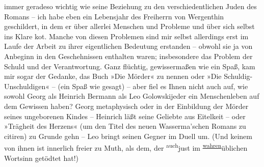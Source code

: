                immer geradeso wichtig wie seine Beziehung zu den verschiedentlichen Juden des Romans – ich habe eben ein
               Lebensjahr des Freiherrn von
                  Wergenthin geschildert, in dem er über allerlei Menschen und Probleme und
               über sich selbst ins Klare ko{\geminationm}t. Manche von diesen
               Problemen sind mir selbst allerdings erst im Laufe der Arbeit zu ihrer eigentlichen
               Bedeutung erstanden – obwohl sie ja von Anbeginn in den Geschehnissen enthalten
               waren; insbesondere das Problem der Schuld und der Verantwortung. Ganz flüchtig,
               gewissermaßen {\pb}wie ein Spaß, kam mir sogar der
               Gedanke, das Buch »Die Mörder« zu nennen oder »Die Schuldig-Unschuldigen« – (ein Spaß
               wie gesagt) – aber fiel es Ihnen nicht auch auf, wie sowohl Georg als Heinrich Bermann als Leo Golowski\introOben{}jeder\introOben{} ein Menschenleben auf dem Gewissen haben? Georg metaphysisch oder in der
               Einbildung der Mörder seines ungeborenen Kindes – Heinrich läßt seine Geliebte aus Eitelkeit – oder »Trägheit des Herzens« (um den Titel des neuen Wasserma{\geminationn}’schen Romans zu citiren) zu {\pb}Grunde gehn –
                  Leo bringt seinen Gegner im
               Duell um. (Und keinem von ihnen ist innerlich freier zu Muth, als dem, der \substVorne{}\textsuperscript{auch}\substDazwischen{}just\substHinten{} im \substVorne{}\textsuperscript{\uline{wahren}}\substDazwischen{}üblichen\substHinten{} Wortsinn getödtet hat!)\pend
           
